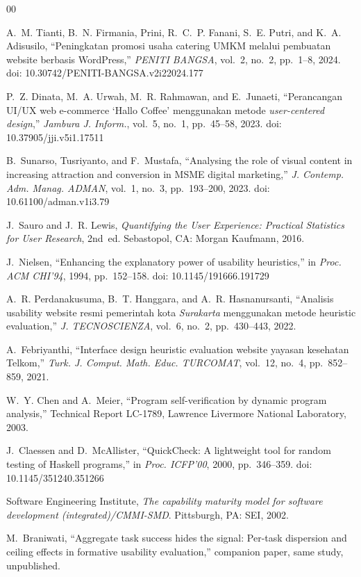 \documentclass[conference]{IEEEtran}
\begin{document}
\begin{thebibliography}{00}

A.~M. Tianti, B.~N. Firmania, Prini, R.~C.~P. Fanani, S.~E. Putri, and K.~A. Adisusilo,
``Peningkatan promosi usaha catering UMKM melalui pembuatan website berbasis WordPress,''
\textit{PENITI BANGSA}, vol.~2, no.~2, pp.~1--8, 2024.
doi: 10.30742/PENITI-BANGSA.v2i22024.177

P.~Z. Dinata, M.~A. Urwah, M.~R. Rahmawan, and E.~Junaeti, ``Perancangan UI/UX web e-commerce
`Hallo Coffee' menggunakan metode \emph{user-centered design},'' \textit{Jambura J. Inform.},
vol.~5, no.~1, pp.~45--58, 2023. doi: 10.37905/jji.v5i1.17511

B.~Sunarso, Tusriyanto, and F.~Mustafa, ``Analysing the role of visual content in increasing
attraction and conversion in MSME digital marketing,'' \textit{J. Contemp. Adm. Manag. ADMAN},
vol.~1, no.~3, pp.~193--200, 2023. doi: 10.61100/adman.v1i3.79

J.~Sauro and J.~R. Lewis, \emph{Quantifying the User Experience: Practical Statistics for User
Research}, 2nd~ed. Sebastopol, CA: Morgan Kaufmann, 2016.

J.~Nielsen, ``Enhancing the explanatory power of usability heuristics,'' in \emph{Proc. ACM CHI'94},
1994, pp.~152--158. doi: 10.1145/191666.191729

A.~R. Perdanakusuma, B.~T. Hanggara, and A.~R. Hasnanursanti, ``Analisis usability website resmi
pemerintah kota \emph{Surakarta} menggunakan metode heuristic evaluation,'' \textit{J. TECNOSCIENZA},
vol.~6, no.~2, pp.~430--443, 2022.

A.~Febriyanthi, ``Interface design heuristic evaluation website yayasan kesehatan Telkom,''
\textit{Turk. J. Comput. Math. Educ. TURCOMAT}, vol.~12, no.~4, pp.~852--859, 2021.

W.~Y. Chen and A.~Meier, ``Program self-verification by dynamic program analysis,'' Technical
Report LC-1789, Lawrence Livermore National Laboratory, 2003.

J.~Claessen and D.~McAllister, ``QuickCheck: A lightweight tool for random testing of Haskell
programs,'' in \emph{Proc. ICFP'00}, 2000, pp.~346--359. doi: 10.1145/351240.351266

Software Engineering Institute, \emph{The capability maturity model for software development
(integrated)/CMMI-SMD}. Pittsburgh, PA: SEI, 2002.

M.~Braniwati, ``Aggregate task success hides the signal: Per-task dispersion and ceiling effects in
formative usability evaluation,'' companion paper, same study, unpublished.

\end{thebibliography}
\end{document}
